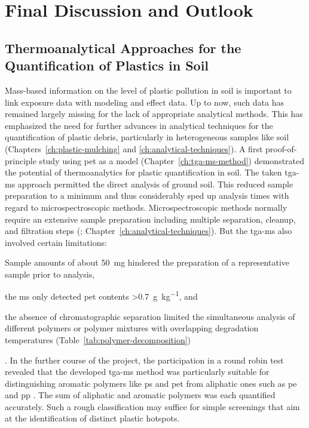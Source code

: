 
\chapter{Final Discussion and Outlook}
\label{ch:general-discussion}

\section{Thermoanalytical Approaches for the Quantification of Plastics in Soil}
\label{sec:general-discussion:analytics}

Mass-based information on the level of plastic pollution in soil is important to link exposure data with modeling and effect data. Up to now, such data has remained largely missing for the lack of appropriate analytical methods. This has emphasized the need for further advances in analytical techniques for the quantification of plastic debris, particularly in heterogeneous samples like soil (Chapters~\ref{ch:plastic-mulching} and \ref{ch:analytical-techniques}).
A first proof-of-principle study using \ac{pet} as a model (Chapter~\ref{ch:tga-ms-method}) demonstrated the potential of thermoanalytics for plastic quantification in soil. The taken \ac{tga-ms} approach permitted the direct analysis of ground soil. This reduced sample preparation to a minimum and thus considerably sped up analysis times with regard to microspectroscopic methods. Microspectroscopic methods normally require an extensive sample preparation including multiple separation, cleanup, and filtration steps (\citealp[for instance,][]{LoderEnzymatic2017}; Chapter~\ref{ch:analytical-techniques}). But the \ac{tga-ms} also involved certain limitations:
\begin{enumerate*}
	\item Sample amounts of about \SI{50}{\milli\gram} hindered the preparation of a representative sample prior to analysis,
	\item the \ac{ms} only detected \ac{pet} contents \SI{>0.7}{\gram\per\kilo\gram}, and
	\item the absence of chromatographic separation limited the simultaneous analysis of different polymers or polymer mixtures with overlapping degradation temperatures (Table~\ref{tab:polymer-decomposition})
\end{enumerate*}.
In the further course of the project, the participation in a round robin test revealed that the developed \ac{tga-ms} method was particularly suitable for distinguishing aromatic polymers like \ac{ps} and \ac{pet} from aliphatic ones such as \ac{pe} and \ac{pp} \citep{BeckerQuantification2020}. The sum of aliphatic and aromatic polymers was each quantified accurately. Such a rough classification may suffice for simple screenings that aim at the identification of distinct plastic hotspots.
